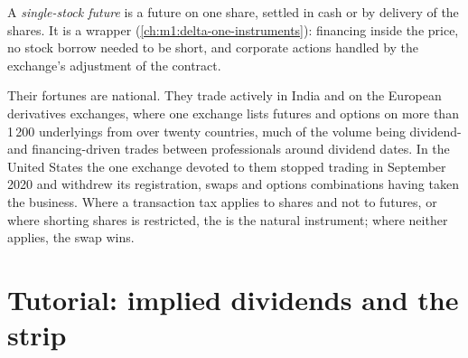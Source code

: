 \begin{definition}\label{def:m1:index-and-single-stock-futures-worldwide:ssf}
A \emph{single-stock future} is a future on one
share, settled in cash or by delivery of the shares. It is a 
wrapper (\cref{ch:m1:delta-one-instruments}): financing inside the price, no
stock borrow needed to be short, and corporate actions handled by the
exchange's adjustment of the contract.
\end{definition}

Their fortunes are national. They trade actively in India and on the
European derivatives exchanges, where one exchange lists futures and options
on more than 1\,200 underlyings from over twenty countries, much of the
volume being dividend- and financing-driven trades between professionals
around dividend dates. In the United States the one exchange devoted to them
stopped trading in September 2020 and withdrew its registration, swaps and
options combinations having taken the business. Where a transaction tax
applies to shares and not to futures, or where shorting shares is
restricted, the  is the natural instrument; where
neither applies, the swap wins.

\section{Tutorial: implied dividends and the strip}\label{tut:m1:index-and-single-stock-futures-worldwide:implied}

